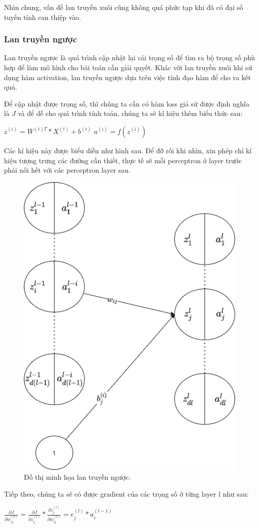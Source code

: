 Nhìn chung, vấn đề lan truyền xuôi cũng không quá phức tạp khi đã có đại số tuyến tính can thiệp vào.

\subsubsection{Lan truyền ngược}
Lan truyền ngược là quá trình cập nhật lại cái trọng số để tìm ra bộ trọng số phù hợp để làm mô hình cho bài toán cần giải quyết. Khác với lan truyền xuôi khi sử dụng hàm activation, lan truyền ngược dựa trên việc tính đạo hàm để cho ra kết quả.

Để cập nhật được trọng số, thì chúng ta cần có hàm loss giả sử được định nghĩa là $J$ và để dễ cho quá trình tính toán, chúng ta sẽ kí hiệu thêm biểu thức sau:
\begin{center}
    $z^{(i)}=W^{(i)T}*X^{(i)}+b^{(i)}$
    $a^{(i)} = f(z^{(i)})$
\end{center}

Các kí hiệu này được biểu diễn như hình sau. Để đỡ rối khi nhìn, xin phép chỉ kí hiệu tượng trưng các đường cần thiết, thực tế sẽ mỗi perceptron ở layer trước phải nối hết với các perceptron layer sau.
\begin{figure}[!h]
	\centering
		\includegraphics[width=0.5\columnwidth]{books/artificial-neural-network/chapter03/figure/ltn.png}
        \caption{Đồ thị minh họa lan truyền ngược.}
        \label{fig:ltn}
		\centering
\end{figure}

Tiếp theo, chúng ta sẽ có được gradient của các trọng số ở từng layer l như sau:
\begin{center}
        $\frac{\partial J}{\partial w^{(l)}_{ij}} = \frac{\partial J}{\partial z_{j}^{(l)}} * \frac{\partial z_{j}^{(l)}}{\partial w^{(l)}_{ij}}=e^{(l)}_{j} * a_{i}^{(l-1)}$\\
\end{center}

